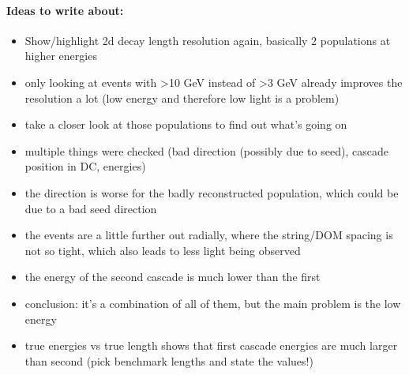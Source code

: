 \paragraph{Ideas to write about:}
\begin{itemize}
    \item Show/highlight 2d decay length resolution again, basically 2 populations at higher energies
    \item only looking at events with >10 GeV instead of >3 GeV already improves the resolution a lot (low energy and therefore low light is a problem)
    \item take a closer look at those populations to find out what's going on
    \item multiple things were checked (bad direction (possibly due to seed), cascade position in DC, energies)
    \item the direction is worse for the badly reconstructed population, which could be due to a bad seed direction
    \item the events are a little further out radially, where the string/DOM spacing is not so tight, which also leads to less light being observed
    \item the energy of the second cascade is much lower than the first
    \item conclusion: it's a combination of all of them, but the main problem is the low energy
    \item true energies vs true length shows that first cascade energies are much larger than second (pick benchmark lengths and state the values!)
\end{itemize}

